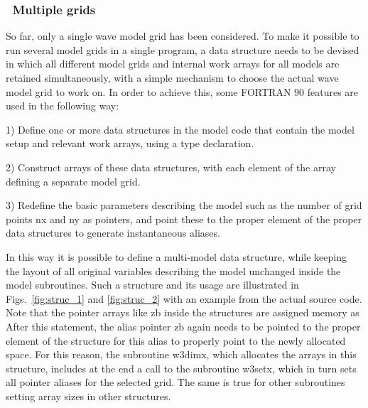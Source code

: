 %

\vsssub
\subsubsection{~Multiple grids} \label{sec:mgrids}
\vsssub

So far, only a single wave model grid has been considered.  To make it
possible to run several model grids in a single program, a data structure
needs to be devised in which all different model grids and internal work
arrays for all models are retained simultaneously, with a simple mechanism to
choose the actual wave model grid to work on. In order to achieve this, some
FORTRAN 90 features \citep[e.g.,][]{bk:MR99} are used in the following way:


\begin{list}{}{\rightmargin 8mm \leftmargin 10mm }

\item [1)] Define one or more data structures in the model code that contain
           the model setup and relevant work arrays, using a {\F type}
           declaration.

\item [2)] Construct arrays of these data structures, with each element of the
           array defining a separate model grid.

\item [3)] Redefine the basic parameters describing the model such as the
           number of grid points {\F nx} and {\F ny} as pointers, and point
           these to the proper element of the proper data structures to
           generate instantaneous aliases.

\end{list}

\noindent
In this way it is possible to define a multi-model data structure, while
keeping the layout of all original variables describing the model unchanged
inside the model subroutines.  Such a structure and its usage are illustrated
in Figs.~\ref{fig:struc_1} and \ref{fig:struc_2} with an example from the
actual source code. Note that the pointer arrays like {\F zb} inside the
structures are assigned memory as 
After this statement, the alias pointer {\F zb} again needs to be pointed to
the proper element of the structure for this alias to properly point to the
newly allocated space. For this reason, the subroutine {\F w3dimx}, which
allocates the arrays in this structure, includes at the end a call to the
subroutine {\F w3setx}, which in turn sets all pointer aliases for the
selected grid. The same is true for other subroutines setting array sizes in
other structures.

